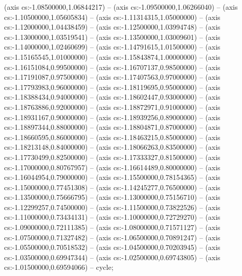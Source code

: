 (axis cs:-1.08500000,1.06844217) -- (axis cs:-1.09500000,1.06266040) -- (axis cs:-1.10500000,1.05605834) -- (axis cs:-1.11314315,1.05000000) -- (axis cs:-1.12000000,1.04438459) -- (axis cs:-1.12500000,1.03994748) -- (axis cs:-1.13000000,1.03519541) -- (axis cs:-1.13500000,1.03009601) -- (axis cs:-1.14000000,1.02460699) -- (axis cs:-1.14791615,1.01500000) -- (axis cs:-1.15165545,1.01000000) -- (axis cs:-1.15843874,1.00000000) -- (axis cs:-1.16151084,0.99500000) -- (axis cs:-1.16707137,0.98500000) -- (axis cs:-1.17191087,0.97500000) -- (axis cs:-1.17407563,0.97000000) -- (axis cs:-1.17793983,0.96000000) -- (axis cs:-1.18119695,0.95000000) -- (axis cs:-1.18388434,0.94000000) -- (axis cs:-1.18602447,0.93000000) -- (axis cs:-1.18763886,0.92000000) -- (axis cs:-1.18872971,0.91000000) -- (axis cs:-1.18931167,0.90000000) -- (axis cs:-1.18939256,0.89000000) -- (axis cs:-1.18897344,0.88000000) -- (axis cs:-1.18804871,0.87000000) -- (axis cs:-1.18660595,0.86000000) -- (axis cs:-1.18463215,0.85000000) -- (axis cs:-1.18213148,0.84000000) -- (axis cs:-1.18066263,0.83500000) -- (axis cs:-1.17730499,0.82500000) -- (axis cs:-1.17333327,0.81500000) -- (axis cs:-1.17000000,0.80767957) -- (axis cs:-1.16614489,0.80000000) -- (axis cs:-1.16044954,0.79000000) -- (axis cs:-1.15500000,0.78154365) -- (axis cs:-1.15000000,0.77451308) -- (axis cs:-1.14245277,0.76500000) -- (axis cs:-1.13500000,0.75666795) -- (axis cs:-1.13000000,0.75156710) -- (axis cs:-1.12299257,0.74500000) -- (axis cs:-1.11500000,0.73822526) -- (axis cs:-1.11000000,0.73434131) -- (axis cs:-1.10000000,0.72729270) -- (axis cs:-1.09000000,0.72111385) -- (axis cs:-1.08000000,0.71571127) -- (axis cs:-1.07500000,0.71327482) -- (axis cs:-1.06500000,0.70891247) -- (axis cs:-1.05500000,0.70518532) -- (axis cs:-1.04500000,0.70203945) -- (axis cs:-1.03500000,0.69947344) -- (axis cs:-1.02500000,0.69743805) -- (axis cs:-1.01500000,0.69594066) -- cycle;
